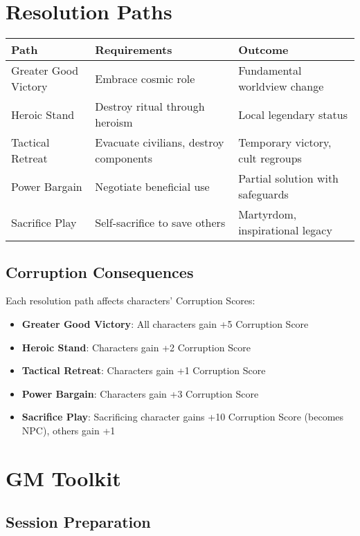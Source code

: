 \documentclass[11pt]{article}
\begin{document}
\newpage

\section{Resolution Paths}

\begin{tabular}{|p{3cm}|p{4cm}|p{5cm}|}
\hline
\textbf{Path} & \textbf{Requirements} & \textbf{Outcome} \\
\hline
Greater Good Victory & Embrace cosmic role & Fundamental worldview change \\
\hline
Heroic Stand & Destroy ritual through heroism & Local legendary status \\
\hline
Tactical Retreat & Evacuate civilians, destroy components & Temporary victory, cult regroups \\
\hline
Power Bargain & Negotiate beneficial use & Partial solution with safeguards \\
\hline
Sacrifice Play & Self-sacrifice to save others & Martyrdom, inspirational legacy \\
\hline
\end{tabular}

\subsection{Corruption Consequences}

Each resolution path affects characters' Corruption Scores:
\begin{itemize}[leftmargin=*]
    \item \textbf{Greater Good Victory}: All characters gain +5 Corruption Score
    \item \textbf{Heroic Stand}: Characters gain +2 Corruption Score
    \item \textbf{Tactical Retreat}: Characters gain +1 Corruption Score
    \item \textbf{Power Bargain}: Characters gain +3 Corruption Score
    \item \textbf{Sacrifice Play}: Sacrificing character gains +10 Corruption Score (becomes NPC), others gain +1
\end{itemize}

\newpage

\section{GM Toolkit}

\subsection{Session Preparation}
\end{document}
